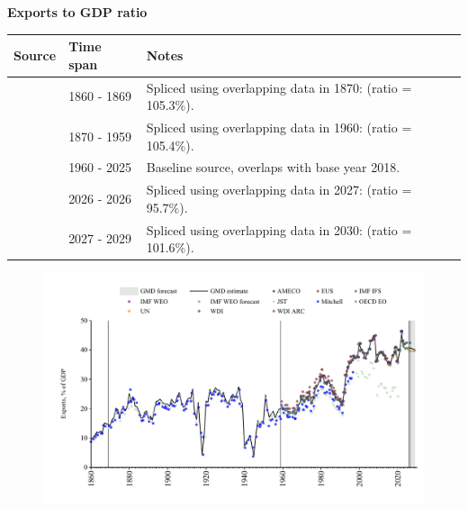 \documentclass[12pt,a4paper,landscape]{article}
\begin{document}
\begin{adjustbox}{max totalsize={\paperwidth}{\paperheight},center}
\begin{minipage}[t][\textheight][t]{\textwidth}
\vspace*{0.5cm}
{}
\begin{center}
{\Large\bfseries Exports to GDP ratio}
\end{center}
\vspace{0.5cm}
\begin{table}[H]
\centering
\small
\begin{tabular}{|l|l|l|}
\hline
\textbf{Source} & \textbf{Time span} & \textbf{Notes} \\
\hline
\rowcolor{white}\cite{Mitchell}& 1860 - 1869 &Spliced using overlapping data in 1870: (ratio = 105.3\%). \\
\rowcolor{lightgray}\cite{JST}& 1870 - 1959 &Spliced using overlapping data in 1960: (ratio = 105.4\%). \\
\rowcolor{white}\cite{OECD_EO}& 1960 - 2025 &Baseline source, overlaps with base year 2018. \\
\rowcolor{lightgray}\cite{AMECO}& 2026 - 2026 &Spliced using overlapping data in 2027: (ratio = 95.7\%). \\
\rowcolor{white}\cite{IMF_WEO_forecast}& 2027 - 2029 &Spliced using overlapping data in 2030: (ratio = 101.6\%). \\
\hline
\end{tabular}
\end{table}
\begin{figure}[H]
\centering
\includegraphics[width=\textwidth,height=0.6\textheight,keepaspectratio]{graphs/FIN_exports_GDP.pdf}
\end{figure}
\end{minipage}
\end{adjustbox}
\end{document}
